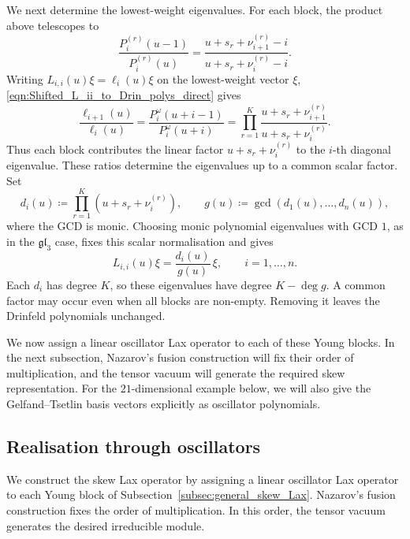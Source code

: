 \documentclass[12pt,reqno]{amsart}
\numberwithin{equation}{section}
\begin{document}
	We next determine the lowest-weight eigenvalues. For each block,
	the product above telescopes to
	\begin{equation}
		\frac{P_i^{(r)}(u-1)}{P_i^{(r)}(u)}
		=\frac{u+s_r+\nu_{i+1}^{(r)}-i}
		{u+s_r+\nu_i^{(r)}-i}.
		\label{eqn:skew_block_Drinfeld_ratio}
	\end{equation}
	Writing $L_{i,i}(u)\xi=\ell_i(u)\xi$ on the lowest-weight
	vector $\xi$, \eqref{eqn:Shifted_L_ii_to_Drin_polys_direct} gives
	\begin{equation}
		\frac{\ell_{i+1}(u)}{\ell_i(u)}
		=\frac{P_i^\omega(u+i-1)}{P_i^\omega(u+i)}
		=\prod_{r=1}^K
		\frac{u+s_r+\nu_{i+1}^{(r)}}{u+s_r+\nu_i^{(r)}}.
		\label{eqn:skew_block_Lax_ratios}
	\end{equation}
	Thus each block contributes the linear factor
	$u+s_r+\nu_i^{(r)}$ to the $i$-th diagonal eigenvalue.
	These ratios determine the eigenvalues up to a common scalar
	factor. Set
	\begin{equation}
		d_i(u)\coloneqq\prod_{r=1}^K(u+s_r+\nu_i^{(r)}),
		\qquad
		g(u)\coloneqq\gcd(d_1(u),\ldots,d_n(u)),
		\label{eqn:skew_block_diagonal_products}
	\end{equation}
	where the GCD is monic. Choosing monic polynomial eigenvalues
	with GCD $1$, as in the $\mathfrak{gl}_3$ case, fixes this scalar
	normalisation and gives
	\begin{equation}
		L_{i,i}(u)\xi=\frac{d_i(u)}{g(u)}\,\xi,
		\qquad i=1,\ldots,n.
		\label{eqn:eigenval_gen_skew_lax_segment}
	\end{equation}
	Each $d_i$ has degree $K$, so these eigenvalues have degree
	$K-\deg g$. A common factor may occur even when all blocks are
	non-empty. Removing it leaves the Drinfeld polynomials unchanged.
	
	We now assign a linear oscillator Lax operator to each of these
	Young blocks. In the next subsection, Nazarov's fusion construction
	will fix their order of multiplication, and the tensor vacuum will
	generate the required skew representation. For the
	$21$-dimensional example below, we will also
	give the Gelfand--Tsetlin basis vectors explicitly as oscillator
	polynomials.

\subsection{Realisation through oscillators}

We construct the skew Lax operator by assigning a linear
oscillator Lax operator to each Young block of
Subsection~\ref{subsec:general_skew_Lax}. Nazarov's fusion
construction fixes the order of multiplication. In this order,
the tensor vacuum generates the desired irreducible module.
\end{document}
